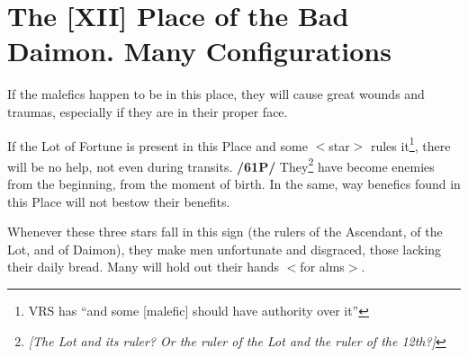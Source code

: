 \section{The [XII] Place of the Bad Daimon. Many Configurations}

If the malefics happen to be in this place, they will cause great wounds and traumas, especially if they are in their proper face. 

If the Lot of Fortune is present in this Place and some $<$star$>$ rules it\footnote{VRS has ``and some [malefic] should have authority over it''}, there will be no help, not even during transits. \textbf{/61P/} They\footnote{\textit{[The Lot and its ruler? Or the ruler of the Lot and the ruler of the 12th?]}} have become enemies from the beginning, from the moment of birth. In the same, way benefics found in this Place will not bestow their benefits. 

Whenever these three stars fall in this sign (the rulers of the Ascendant, of the Lot, and of Daimon), they make men unfortunate and disgraced, those lacking their daily bread. Many will hold out their hands $<$for alms$>$.

\newpage